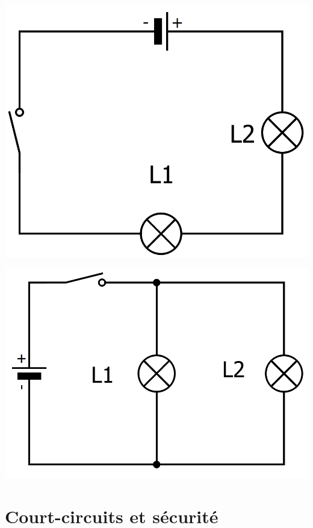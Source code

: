 \documentclass[xcolor={dvipsnames}]{beamer}
\begin{document}
\begin{frame}


	
			\begin{center}
				\includegraphics[scale=0.2]{../img/serie}
			\end{center}
			\begin{center}
				\includegraphics[scale=0.2]{../img/drv}      
			\end{center}
	

\end{frame}

\section{Court-circuits et sécurité}
\end{document}
